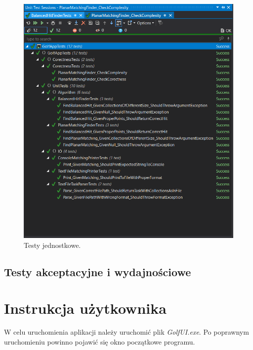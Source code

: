 \documentclass[10pt,a4paper]{article}
\begin{document}
	\begin{figure}[H]
		\centering
			\includegraphics[scale=0.6]{images/unittests.png}
 			\caption{Testy jednostkowe.}
 		\label{fig:unit_tests}
	\end{figure}	
	
	\subsection{Testy akceptacyjne i wydajnościowe}
	
	\pagebreak
	
	\section{Instrukcja użytkownika}
	
	W celu uruchomienia aplikacji należy uruchomić plik \textit{GolfUI.exe}. Po poprawnym uruchomieniu powinno pojawić się okno początkowe programu. 
	
\end{document}
